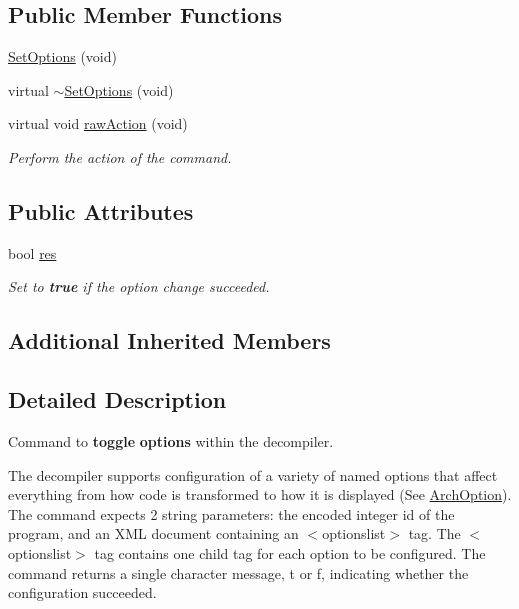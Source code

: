 \subsection*{Public Member Functions}
\begin{DoxyCompactItemize}
\item 
\mbox{\hyperlink{class_set_options_a2712c10fd1378d9f4e40ad93d2b9fe93}{Set\+Options}} (void)
\item 
virtual \mbox{\hyperlink{class_set_options_aef37b96807c1e29662e725bbeefcc489}{$\sim$\+Set\+Options}} (void)
\item 
virtual void \mbox{\hyperlink{class_set_options_a1e73126b79340651e9fa9cfc47e80649}{raw\+Action}} (void)
\begin{DoxyCompactList}\small\item\em Perform the action of the command. \end{DoxyCompactList}\end{DoxyCompactItemize}
\subsection*{Public Attributes}
\begin{DoxyCompactItemize}
\item 
bool \mbox{\hyperlink{class_set_options_aed159d40f964c60e9983bbfac3787c76}{res}}
\begin{DoxyCompactList}\small\item\em Set to {\bfseries{true}} if the option change succeeded. \end{DoxyCompactList}\end{DoxyCompactItemize}
\subsection*{Additional Inherited Members}


\subsection{Detailed Description}
Command to {\bfseries{toggle}} {\bfseries{options}} within the decompiler. 

The decompiler supports configuration of a variety of named options that affect everything from how code is transformed to how it is displayed (See \mbox{\hyperlink{class_arch_option}{Arch\+Option}}). The command expects 2 string parameters\+: the encoded integer id of the program, and an X\+ML document containing an $<$optionslist$>$ tag. The $<$optionslist$>$ tag contains one child tag for each option to be configured. The command returns a single character message, \textquotesingle{}t\textquotesingle{} or \textquotesingle{}f\textquotesingle{}, indicating whether the configuration succeeded. 

